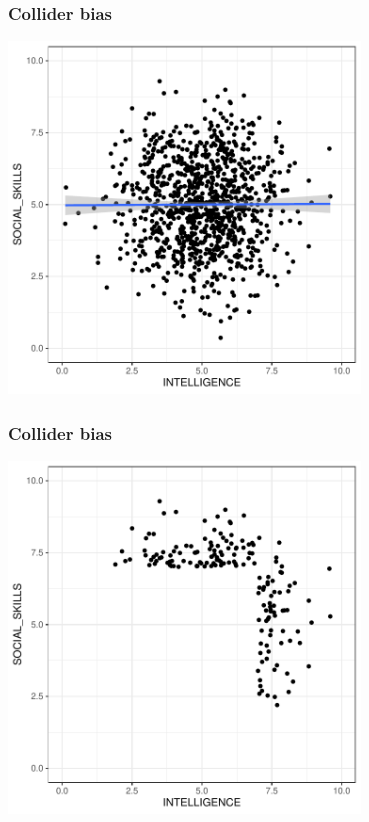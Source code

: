 \documentclass[aspectratio=43]{beamer}
\begin{document}
\begin{frame}
\frametitle{Collider bias}
\centering

\includegraphics[width = 0.7\textwidth]{../img/collider2}

\end{frame}

\begin{frame}
\frametitle{Collider bias}
\centering

\includegraphics[width = 0.7\textwidth]{../img/collider3}

\end{frame}
\end{document}
